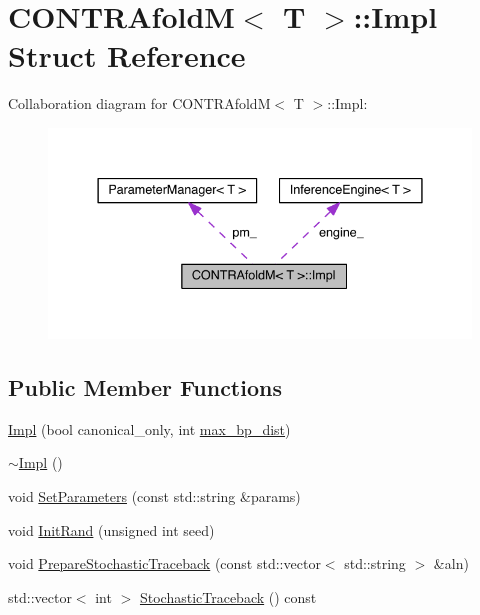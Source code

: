 \hypertarget{struct_c_o_n_t_r_afold_m_1_1_impl}{\section{C\+O\+N\+T\+R\+Afold\+M$<$ T $>$\+:\+:Impl Struct Reference}
\label{struct_c_o_n_t_r_afold_m_1_1_impl}
}


Collaboration diagram for C\+O\+N\+T\+R\+Afold\+M$<$ T $>$\+:\+:Impl\+:
\nopagebreak
\begin{figure}[H]
\begin{center}
\leavevmode
\includegraphics[width=337pt]{struct_c_o_n_t_r_afold_m_1_1_impl__coll__graph}
\end{center}
\end{figure}
\subsection*{Public Member Functions}
\begin{DoxyCompactItemize}
\item 
\hyperlink{struct_c_o_n_t_r_afold_m_1_1_impl_a770a0ab7aebe80a4d453a8faf1696248}{Impl} (bool canonical\+\_\+only, int \hyperlink{class_c_o_n_t_r_afold_m_a570e8b37cff3eb4b209887c945c6c0e2}{max\+\_\+bp\+\_\+dist})
\item 
\hyperlink{struct_c_o_n_t_r_afold_m_1_1_impl_ab56d56d4e196ef51e31923ca1d0a4600}{$\sim$\+Impl} ()
\item 
void \hyperlink{struct_c_o_n_t_r_afold_m_1_1_impl_a3cf6d30aba17266dd33c7bcd28f16cf2}{Set\+Parameters} (const std\+::string \&params)
\item 
void \hyperlink{struct_c_o_n_t_r_afold_m_1_1_impl_af0e3b860ba28f13d604eb4be71ade866}{Init\+Rand} (unsigned int seed)
\item 
void \hyperlink{struct_c_o_n_t_r_afold_m_1_1_impl_a060e2cc0363e787e67e6110e5ff06d03}{Prepare\+Stochastic\+Traceback} (const std\+::vector$<$ std\+::string $>$ \&aln)
\item 
std\+::vector$<$ int $>$ \hyperlink{struct_c_o_n_t_r_afold_m_1_1_impl_a4e93ce3e2148bd5777d6500ff3ceedbd}{Stochastic\+Traceback} () const 
\end{DoxyCompactItemize}
